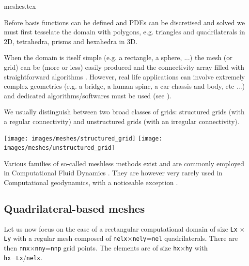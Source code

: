 \begin{flushright} {\tiny {\color{gray} meshes.tex}} \end{flushright}

Before basis functions can be defined and PDEs can be discretised and solved 
we must first tesselate the domain with polygons, e.g. triangles and 
quadrilaterals in 2D, tetrahedra, prisms and hexahedra in 3D.  

When the domain is itself simple (e.g. a rectangle, a sphere, ...) the mesh (or grid) can 
be (more or less) easily produced and the connectivity array filled with straightforward 
algorithms \cite{thie18}.
However, real life applications can involve extremely complex geometries (e.g. a bridge, 
a human spine, a car chassis and body, etc ...) and dedicated algorithms/softwares 
must be used (see \cite{thsw,frge,xiyz09}). 

We usually distinguish between two broad classes of grids: structured grids (with a regular 
connectivity) and unstructured grids (with an irregular connectivity).
 

\begin{center}
\texttt{[image: images/meshes/structured\_grid]}
\texttt{[image: images/meshes/unstructured\_grid]}
\end{center}

\begin{remark}
Various families of so-called meshless methods exist and are commonly employed in Computational 
Fluid Dynamics \cite{liugu,liliu,grliu,liuliu}. They are however very rarely used in 
Computational geodynamics, with a noticeable exception \cite{hans03}.
\end{remark}

\subsection{Quadrilateral-based meshes}

Let us now focus on the case of a rectangular computational domain of size 
{\tt Lx} $\times$ {\tt Ly} with a regular mesh composed of {\tt nelx}$\times${\tt nely}={\tt nel}
   quadrilaterals.  
There are then {\tt nnx}$\times${\tt nny}={\tt nnp} grid points.
The elements are of size {\tt hx}$\times${\tt hy} with {\tt hx}={\tt Lx}/{\tt nelx}.

